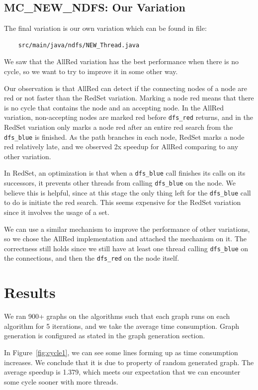 \documentclass[a4paper]{article}
\begin{document}
\subsection{MC\_NEW\_NDFS: Our Variation}

The final variation is our own variation which can be found in file:

\begin{verbatim}
    src/main/java/ndfs/NEW_Thread.java
\end{verbatim}

We saw that the AllRed variation has the best performance when there is no cycle,
so we want to try to improve it in some other way.

Our observation is that AllRed can detect if the connecting nodes of a node are red or not faster than the RedSet variation. Marking a node red means that there is no cycle
that contains the node and an accepting node. In the AllRed variation, non-accepting nodes are marked red before \texttt{dfs\_red} returns, and in the RedSet variation only marks a node red after an entire red search from the \texttt{dfs\_blue} is finished. As the path branches in each node, RedSet marks a node red relatively late, and we observed 2x speedup for AllRed comparing to any other variation.

In RedSet, an optimization is that when a \texttt{dfs\_blue} call finishes its calls on its successors, it prevents other threads from calling \texttt{dfs\_blue} on the node. We believe this is helpful, since at this stage the only thing left for the \texttt{dfs\_blue} call to do is initiate the red search. This seems expensive for the RedSet variation since it involves the usage of a set. 

We can use a similar mechanism to improve the performance of other variations, so we chose the AllRed implementation and attached the mechanism on it. 
The correctness still holds since we still have at least one thread calling \texttt{dfs\_blue}
on the connections, and then the \texttt{dfs\_red} on the node itself.


\section{Results}\label{experiments}
We ran 900+ graphs on the algorithms such that each graph runs on
each algorithm for 5 iterations, and we take the average time consumption.
Graph generation is configured as stated in the graph generation section.

In Figure~\ref{fig:cycle1}, we can see some lines forming up as time consumption increases. We conclude that it is due to property of random generated graph.
The average speedup is 1.379, which meets our expectation that we can encounter some cycle sooner with more threads.
\end{document}

